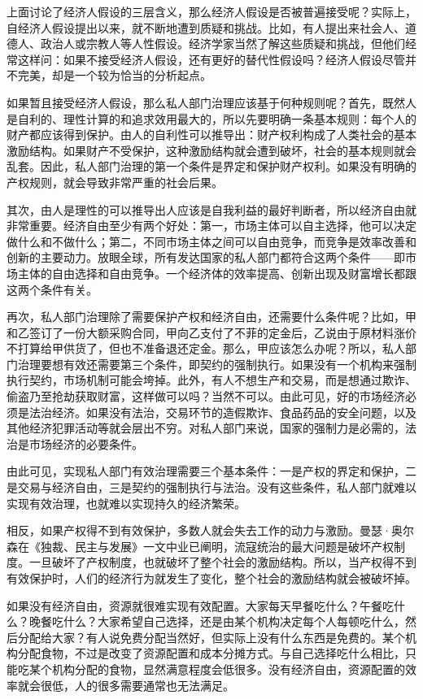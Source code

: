 上面讨论了经济人假设的三层含义，那么经济人假设是否被普遍接受呢？实际上，自经济人假设提出以来，就不断地遭到质疑和挑战。比如，有人提出来社会人、道德人、政治人或宗教人等人性假设。经济学家当然了解这些质疑和挑战，但他们经常这样问：如果不接受经济人假设，还有更好的替代性假设吗？经济人假设尽管并不完美，却是一个较为恰当的分析起点。


如果暂且接受经济人假设，那么私人部门治理应该基于何种规则呢？首先，既然人是自利的、理性计算的和追求效用最大的，所以先要明确一条基本规则：每个人的财产都应该得到保护。由人的自利性可以推导出：财产权利构成了人类社会的基本激励结构。如果财产不受保护，这种激励结构就会遭到破坏，社会的基本规则就会乱套。因此，私人部门治理的第一个条件是界定和保护财产权利。如果没有明确的产权规则，就会导致非常严重的社会后果。

其次，由人是理性的可以推导出人应该是自我利益的最好判断者，所以经济自由就非常重要。经济自由至少有两个好处：第一，市场主体可以自主选择，他可以决定做什么和不做什么；第二，不同市场主体之间可以自由竞争，而竞争是效率改善和创新的主要动力。放眼全球，所有发达国家的私人部门都符合这两个条件——即市场主体的自由选择和自由竞争。一个经济体的效率提高、创新出现及财富增长都跟这两个条件有关。

再次，私人部门治理除了需要保护产权和经济自由，还需要什么条件呢？比如，甲和乙签订了一份大额采购合同，甲向乙支付了不菲的定金后，乙说由于原材料涨价不打算给甲供货了，但也不准备退还定金。那么，甲应该怎么办呢？所以，私人部门治理要想有效还需要第三个条件，即契约的强制执行。如果没有一个机构来强制执行契约，市场机制可能会垮掉。此外，有人不想生产和交易，而是想通过欺诈、偷盗乃至抢劫获取财富，这样做可以吗？当然不可以。由此可见，好的市场经济必须是法治经济。如果没有法治，交易环节的造假欺诈、食品药品的安全问题，以及其他经济犯罪活动等就会层出不穷。对私人部门来说，国家的强制力是必需的，法治是市场经济的必要条件。

由此可见，实现私人部门有效治理需要三个基本条件：一是产权的界定和保护，二是交易与经济自由，三是契约的强制执行与法治。没有这些条件，私人部门就难以实现有效治理，也就难以实现持久的经济繁荣。

相反，如果产权得不到有效保护，多数人就会失去工作的动力与激励。曼瑟·奥尔森在《独裁、民主与发展》一文中业已阐明，流寇统治的最大问题是破坏产权制度。一旦破坏了产权制度，也就破坏了整个社会的激励结构。所以，当产权得不到有效保护时，人们的经济行为就发生了变化，整个社会的激励结构就会被破坏掉。

如果没有经济自由，资源就很难实现有效配置。大家每天早餐吃什么？午餐吃什么？晚餐吃什么？大家希望自己选择，还是由某个机构决定每个人每顿吃什么，然后分配给大家？有人说免费分配当然好，但实际上没有什么东西是免费的。某个机构分配食物，不过是改变了资源配置和成本分摊方式。与自己选择吃什么相比，只能吃某个机构分配的食物，显然满意程度会低很多。没有经济自由，资源配置的效率就会很低，人的很多需要通常也无法满足。

